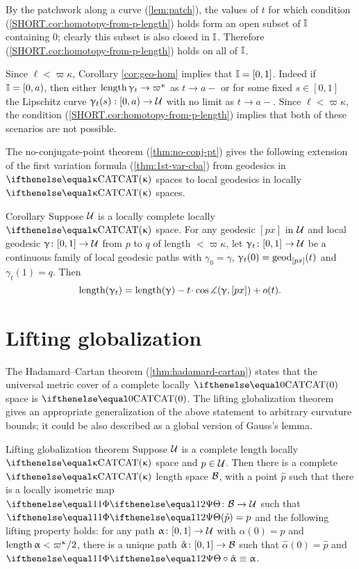 By the patchwork along a curve (\ref{lem:patch}), the values of $t$ for which condition (\ref{SHORT.cor:homotopy-from-p-length}) holds form an open subset of $\mathbb{I}$ containing $0$; clearly this subset is also closed in $\mathbb{I}$.
Therefore (\ref{SHORT.cor:homotopy-from-p-length}) holds on all of $\mathbb{I}$. 
 
Since $\ell<\varpi\kappa$, Corollary \ref{cor:geo-hom} implies that
$\mathbb{I}=[0,1]$.
Indeed if $\mathbb{I}=[0,a)$, then either $\length\gamma_t\to\varpi\kappa$ as $t\to a-$
or for some fixed $s\in [0,1]$ the Lipschitz curve $\gamma_t(s):[0,a)\to\spc{U}$ with no limit as $t\to a-$.
Since $\ell<\varpi\kappa$, the condition (\ref{SHORT.cor:homotopy-from-p-length}) implies that both of these scenarios are not possible.
\qeds

The no-conjugate-point theorem  (\ref{thm:no-conj-pt}) gives the following extension of the first variation formula (\ref{thm:1st-var-cba}) from geodesics in $\CAT\kappa$ spaces to local geodesics in locally $\CAT\kappa$ spaces.

\begin{thm}{Corollary}\label{cor:1st-var++cba}
Suppose $\mathcal{U}$ is a locally complete locally $\CAT\kappa$ space. 
For any geodesic $[px]$ in $\mathcal{U}$ and local geodesic $\gamma\:[0,1]\to \spc{U}$ from $p$ to $q$ of  length $<\varpi\kappa$, let  $\gamma_t\:[0,1]\to \spc{U}$ be a continuous family of local geodesic paths with $\gamma_0=\gamma$, $\upgamma_t(0)=\mathrm{geod}_{[p x]}(t)$ and $\gamma_t(1)=q$.  Then
\[\length(\gamma_t)
=
\length(\gamma)-t\cdot\cos\mangle(\gamma,[px])+o(t).
\]

\end{thm}





\section{Lifting globalization}\label{sec:cat-globalize}

The Hadamard--Cartan theorem (\ref{thm:hadamard-cartan}) states that 
the universal metric cover of a complete locally $\CAT0$ space is $\CAT0$.
The lifting globalization theorem gives an appropriate generalization of the above statement to arbitrary curvature bounds;
it could be also described as a global version of Gauss's lemma.



\begin{thm}{Lifting globalization theorem}
\label{thm:globalization-lift}
Suppose $\mathcal{U}$ is a complete length locally $\CAT\kappa$ space and  $p\in\spc{U}$.
Then there is a complete $\CAT\kappa$ length space $\mathcal{B}$, 
with a point $\hat p$ such that 
there is a locally isometric map $\map\:\spc{B}\to\spc{U}$
such that $\map(\hat p)=p$ and the following lifting property holds: 
for any path $\alpha\:[0,1]\to\spc{U}$ with $\alpha(0)=p$ and $\length\alpha<\varpi\kappa/2$, 
there is a unique path $\hat\alpha \:[0,1]\to \spc{B}$ such that $\hat\alpha(0)=\hat p$ 
and $\map\circ\hat\alpha\equiv\alpha$.


\end{thm}

